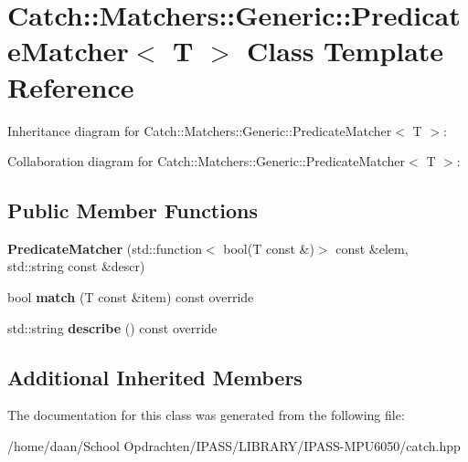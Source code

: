\hypertarget{classCatch_1_1Matchers_1_1Generic_1_1PredicateMatcher}{}\section{Catch\+:\+:Matchers\+:\+:Generic\+:\+:Predicate\+Matcher$<$ T $>$ Class Template Reference}
\label{classCatch_1_1Matchers_1_1Generic_1_1PredicateMatcher}


Inheritance diagram for Catch\+:\+:Matchers\+:\+:Generic\+:\+:Predicate\+Matcher$<$ T $>$\+:


Collaboration diagram for Catch\+:\+:Matchers\+:\+:Generic\+:\+:Predicate\+Matcher$<$ T $>$\+:
\subsection*{Public Member Functions}
\begin{DoxyCompactItemize}
\item 
\mbox{\label{classCatch_1_1Matchers_1_1Generic_1_1PredicateMatcher_a57d53ef028c2f7b92b016f627f91aa76}} 
{\bfseries Predicate\+Matcher} (std\+::function$<$ bool(T const \&)$>$ const \&elem, std\+::string const \&descr)
\item 
\mbox{\label{classCatch_1_1Matchers_1_1Generic_1_1PredicateMatcher_a2ec0e8ec19c4c5e26271d59a06a62b52}} 
bool {\bfseries match} (T const \&item) const override
\item 
\mbox{\label{classCatch_1_1Matchers_1_1Generic_1_1PredicateMatcher_af7d59e94892cc09471bbaefac4c889fd}} 
std\+::string {\bfseries describe} () const override
\end{DoxyCompactItemize}
\subsection*{Additional Inherited Members}


The documentation for this class was generated from the following file\+:\begin{DoxyCompactItemize}
\item 
/home/daan/\+School Opdrachten/\+I\+P\+A\+S\+S/\+L\+I\+B\+R\+A\+R\+Y/\+I\+P\+A\+S\+S-\/\+M\+P\+U6050/catch.\+hpp\end{DoxyCompactItemize}
